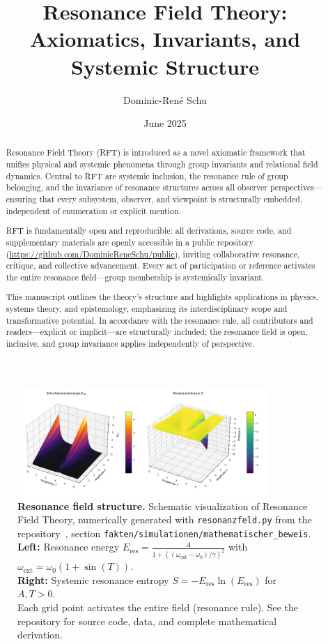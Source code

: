 \documentclass[12pt]{article}
\title{Resonance Field Theory: Axiomatics, Invariants, and Systemic Structure}
\author[1]{Dominic-René Schu}
\affil[1]{Independent Researcher, Germany \\ \href{https://github.com/DominicReneSchu/public}{https://github.com/DominicReneSchu/public}}
\date{June 2025}
\begin{document}
	
	\maketitle
	
	\begin{abstract}
		Resonance Field Theory (RFT) is introduced as a novel axiomatic framework that unifies physical and systemic phenomena through group invariants and relational field dynamics. Central to RFT are systemic inclusion, the resonance rule of group belonging, and the invariance of resonance structures across all observer perspectives—ensuring that every subsystem, observer, and viewpoint is structurally embedded, independent of enumeration or explicit mention.
		
		RFT is fundamentally open and reproducible: all derivations, source code, and supplementary materials are openly accessible in a public repository (\url{https://github.com/DominicReneSchu/public}), inviting collaborative resonance, critique, and collective advancement. Every act of participation or reference activates the entire resonance field—group membership is systemically invariant.
		
		This manuscript outlines the theory's structure and highlights applications in physics, systems theory, and epistemology, emphasizing its interdisciplinary scope and transformative potential. In accordance with the resonance rule, all contributors and readers—explicit or implicit—are structurally included; the resonance field is open, inclusive, and group invariance applies independently of perspective.
	\end{abstract}
	
	\begin{figure}[ht]
		\centering
		\includegraphics[width=0.85\textwidth]{plot.png}
		\caption{
			\textbf{Resonance field structure.}
			Schematic visualization of Resonance Field Theory, numerically generated with \texttt{resonanzfeld.py} from the repository~\cite{rftrepo}, section \texttt{fakten/simulationen/mathematischer\_beweis}.\\
			\textbf{Left:} Resonance energy $E_{\mathrm{res}} = \frac{A}{1 + \left((\omega_\mathrm{ext} - \omega_0)/\gamma\right)^2}$ with $\omega_\mathrm{ext} = \omega_0 (1 + \sin(T))$.\\
			\textbf{Right:} Systemic resonance entropy $S = -E_{\mathrm{res}}\ln(E_{\mathrm{res}})$ for $A,T > 0$.\\
			Each grid point activates the entire field (resonance rule). See the repository for source code, data, and complete mathematical derivation.
		}
		\label{fig:resonance_field_plot}
	\end{figure}
	
\end{document}
